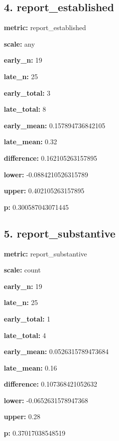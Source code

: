 \documentclass[10pt,a4paper]{article}
\begin{document}
\subsection*{4.\allowbreak{} report\_\allowbreak{}established}
\textbf{metric:} report\_\allowbreak{}established\par
\textbf{scale:} any\par
\textbf{early\_\allowbreak{}n:} 19\par
\textbf{late\_\allowbreak{}n:} 25\par
\textbf{early\_\allowbreak{}total:} 3\par
\textbf{late\_\allowbreak{}total:} 8\par
\textbf{early\_\allowbreak{}mean:} 0.\allowbreak{}157894736842105\par
\textbf{late\_\allowbreak{}mean:} 0.\allowbreak{}32\par
\textbf{difference:} 0.\allowbreak{}162105263157895\par
\textbf{lower:} -\allowbreak{}0.\allowbreak{}0884210526315789\par
\textbf{upper:} 0.\allowbreak{}402105263157895\par
\textbf{p:} 0.\allowbreak{}300587043071445\par
\subsection*{5.\allowbreak{} report\_\allowbreak{}substantive}
\textbf{metric:} report\_\allowbreak{}substantive\par
\textbf{scale:} count\par
\textbf{early\_\allowbreak{}n:} 19\par
\textbf{late\_\allowbreak{}n:} 25\par
\textbf{early\_\allowbreak{}total:} 1\par
\textbf{late\_\allowbreak{}total:} 4\par
\textbf{early\_\allowbreak{}mean:} 0.\allowbreak{}0526315789473684\par
\textbf{late\_\allowbreak{}mean:} 0.\allowbreak{}16\par
\textbf{difference:} 0.\allowbreak{}107368421052632\par
\textbf{lower:} -\allowbreak{}0.\allowbreak{}0652631578947368\par
\textbf{upper:} 0.\allowbreak{}28\par
\textbf{p:} 0.\allowbreak{}37017038548519\par
\end{document}
